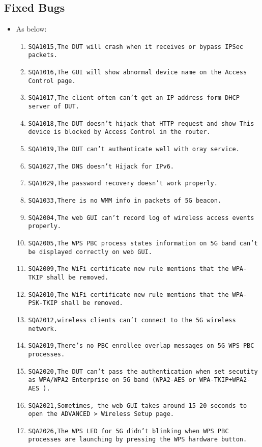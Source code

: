 \documentclass[12pt]{report}
\begin{document}
    \subsection{Fixed Bugs}
    \begin{itemize}
    \item As below:
    	\begin{enumerate}
		\item \texttt{SQA1015,The DUT will crash when it receives or bypass IPSec packets.}
		\item \texttt{SQA1016,The GUI will show abnormal device name on the Access Control page.}
		\item \texttt{SQA1017,The client often can't get an IP address form DHCP server of DUT.}
		\item \texttt{SQA1018,The DUT doesn't hijack that HTTP request and show This device is blocked by Access Control in the router.}
		\item \texttt{SQA1019,The DUT can't authenticate well with oray service.}
		\item \texttt{SQA1027,The DNS doesn't Hijack for IPv6.}
		\item \texttt{SQA1029,The password recovery doesn't work properly.}
		\item \texttt{SQA1033,There is no WMM info in packets of 5G beacon.}
		\item \texttt{SQA2004,The web GUI can't record log of wireless access events properly.}
		\item \texttt{SQA2005,The WPS PBC process states information on 5G band can't be displayed correctly on web GUI. }
		\item \texttt{SQA2009,The WiFi certificate new rule mentions that the WPA-TKIP shall be removed.}
		\item \texttt{SQA2010,The WiFi certificate new rule mentions that the WPA-PSK-TKIP shall be removed.}
		\item \texttt{SQA2012,wireless clients can't connect to the 5G wireless network.}
		\item \texttt{SQA2019,There's no PBC enrollee overlap messages on  5G WPS PBC processes.}
		\item \texttt{SQA2020,The DUT can't pass the authentication when set secutity as WPA/WPA2 Enterprise on 5G band (WPA2-AES or WPA-TKIP+WPA2-AES ).}
		\item \texttt{SQA2021,Sometimes, the web GUI takes around 15~20 seconds to open the ADVANCED > Wireless Setup page.}
		\item \texttt{SQA2026,The WPS LED for 5G didn't blinking when WPS PBC processes are launching by pressing the WPS hardware button.}

\end{enumerate}
\end{itemize}
\end{document}
